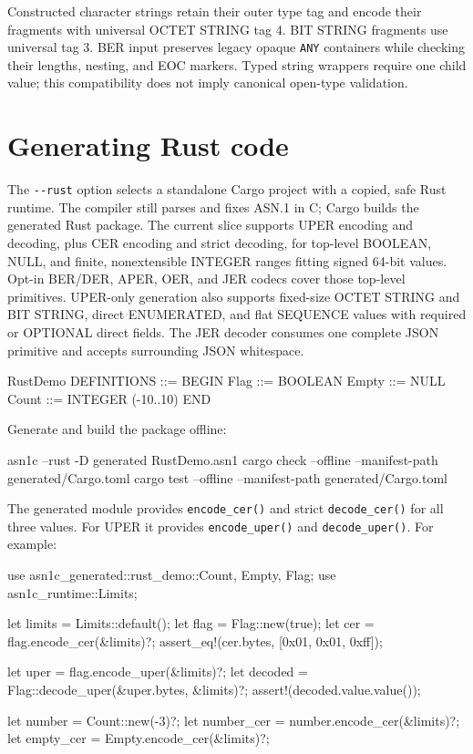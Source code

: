 \documentclass[english,oneside,12pt]{book}
\begin{document}
Constructed character strings retain their outer type tag and encode their
fragments with universal OCTET STRING tag 4. BIT STRING fragments use universal
tag 3. BER input preserves legacy opaque \texttt{ANY} containers while checking
their lengths, nesting, and EOC markers. Typed string wrappers require one
child value; this compatibility does not imply canonical open-type validation.

\section{\label{sec:Rust-output}Generating Rust code}

The \texttt{-{}-rust} option selects a standalone Cargo project with a copied,
safe Rust runtime. The compiler still parses and fixes ASN.1 in C; Cargo builds
the generated Rust package. The current slice supports UPER encoding and
decoding, plus CER encoding and strict decoding, for top-level BOOLEAN, NULL, and finite,
nonextensible INTEGER ranges fitting signed 64-bit values.
Opt-in BER/DER, APER, OER, and JER codecs cover those top-level primitives.
UPER-only generation also supports fixed-size OCTET STRING and BIT STRING,
direct ENUMERATED, and flat SEQUENCE values with required or OPTIONAL direct
fields. The JER decoder consumes one complete JSON primitive and accepts
surrounding JSON whitespace.

\begin{asn}[literate={-}{{\char45}}1]
RustDemo DEFINITIONS ::= BEGIN
Flag ::= BOOLEAN
Empty ::= NULL
Count ::= INTEGER (-10..10)
END
\end{asn}

Generate and build the package offline:

\begin{bash}[literate={-}{{\char45}}1]
asn1c --rust -D generated RustDemo.asn1
cargo check --offline --manifest-path generated/Cargo.toml
cargo test --offline --manifest-path generated/Cargo.toml
\end{bash}

The generated module provides \texttt{encode\_cer()} and strict
\texttt{decode\_cer()} for all three values.
For UPER it provides \texttt{encode\_uper()} and \texttt{decode\_uper()}.
For example:

\begin{codesample}[basicstyle=\scriptsize\listingfont,literate={-}{{\char45}}1]
use asn1c_generated::rust_demo::{Count, Empty, Flag};
use asn1c_runtime::Limits;

let limits = Limits::default();
let flag = Flag::new(true);
let cer = flag.encode_cer(&limits)?;
assert_eq!(cer.bytes, [0x01, 0x01, 0xff]);

let uper = flag.encode_uper(&limits)?;
let decoded = Flag::decode_uper(&uper.bytes, &limits)?;
assert!(decoded.value.value());

let number = Count::new(-3)?;
let number_cer = number.encode_cer(&limits)?;
let empty_cer = Empty.encode_cer(&limits)?;
\end{codesample}
\end{document}
